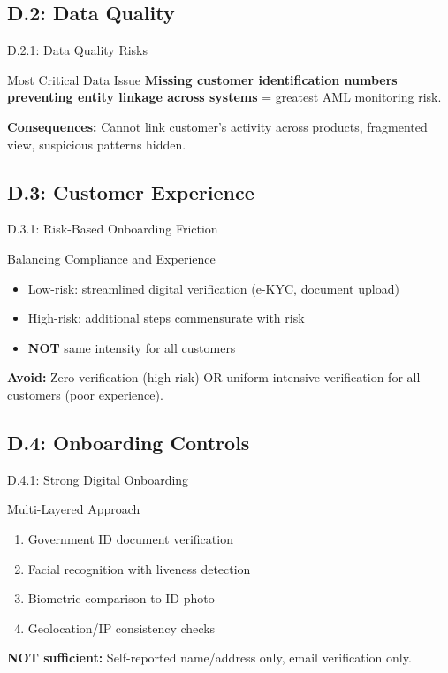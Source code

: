 \documentclass{beamer}
\begin{document}
		\subsection{D.2: Data Quality}
		
		\begin{frame}{D.2.1: Data Quality Risks}
			\begin{block}{Most Critical Data Issue}
				\textbf{Missing customer identification numbers preventing entity linkage across systems} = greatest AML monitoring risk.
			\end{block}
			\textbf{Consequences:} Cannot link customer's activity across products, fragmented view, suspicious patterns hidden.
		\end{frame}
		
		\subsection{D.3: Customer Experience}
		
		\begin{frame}{D.3.1: Risk-Based Onboarding Friction}
			\begin{block}{Balancing Compliance and Experience}
				\begin{itemize}
					\item Low-risk: streamlined digital verification (e-KYC, document upload)
					\item High-risk: additional steps commensurate with risk
					\item \textbf{NOT} same intensity for all customers
				\end{itemize}
			\end{block}
			\textbf{Avoid:} Zero verification (high risk) OR uniform intensive verification for all customers (poor experience).
		\end{frame}
		
		\subsection{D.4: Onboarding Controls}
		
		\begin{frame}{D.4.1: Strong Digital Onboarding}
			\begin{block}{Multi-Layered Approach}
				\begin{enumerate}
					\item Government ID document verification
					\item Facial recognition with liveness detection
					\item Biometric comparison to ID photo
					\item Geolocation/IP consistency checks
				\end{enumerate}
			\end{block}
			\textbf{NOT sufficient:} Self-reported name/address only, email verification only.
		\end{frame}
		
\end{document}
